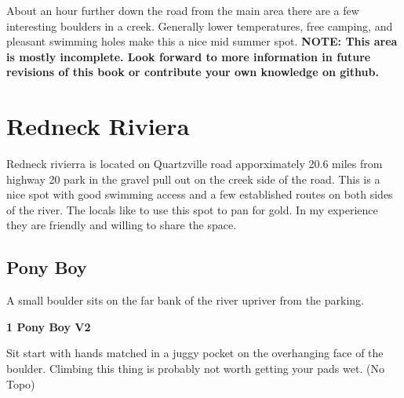 \raggedcolumns
\begin{multicols}{2}
\begin{minipage}{\columnwidth}
About an hour further down the road from the main area there are a few interesting boulders in a creek. Generally lower temperatures, free camping, and pleasant swimming holes make this a nice mid summer spot.
\newline
\textbf{NOTE: This area is mostly incomplete. Look forward to more information in future revisions of this book or contribute your own knowledge on github.}
\end{minipage}

\newpage
		\section{Redneck Riviera}\label{sa:Redneck Riviera}
	\begin{minipage}{\columnwidth}
	Redneck rivierra is located on Quartzville road apporximately 20.6 miles from highway 20 park in the gravel pull out on the creek side of the road. This is a nice spot with good swimming access and a few established routes on both sides of the river. The locals like to use this spot to pan for gold. In my experience they are friendly and willing to share the space.
	\end{minipage}
	
			\begin{minipage}{\columnwidth}
			\subsection*{Pony Boy}\label{bf:Pony Boy}
			A small boulder sits on the far bank of the river upriver from the parking.
			
			\end{minipage}
			
					\begin{minipage}{\linewidth}	
					\label{rt:Pony Boy}
\colorbox{green!20}{
\parbox{0.95\textwidth}{
\textbf{
1 Pony Boy V2  
}
}
}

					\begin{adjustwidth}{0.5cm}{}				
					Sit start with hands matched in a juggy pocket on the overhanging face of the boulder. Climbing this thing is probably not worth getting your pads wet.
						\newline (No Topo) 
					\end{adjustwidth}
					\end{minipage}
			\begin{minipage}{\columnwidth}

\end{minipage}
\end{multicols}
